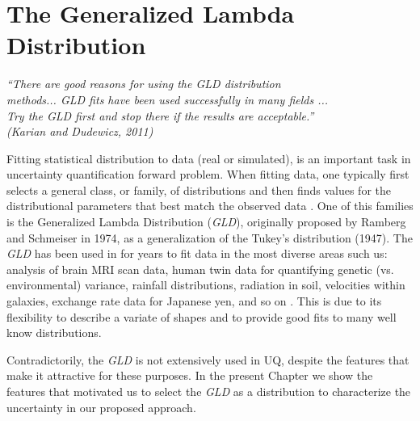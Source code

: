 \chapter[The Generalized Lambda Distribution]{The Generalized Lambda Distribution}\label{cap:gld}

\begin{flushright}
	\textit{``There are good reasons for using the GLD distribution \\
	methods... GLD fits have been used successfully in many fields ...\\
	Try the GLD first and stop there if the results are acceptable.''\\
	(Karian and Dudewicz, 2011)}
\end{flushright}


Fitting statistical distribution to data (real or simulated), is an important task in uncertainty quantification forward problem. When fitting data, one typically first selects a general class, or family, of distributions and then finds values for the distributional parameters that best match the observed data \cite{Lakhany2000}. One of this families is the Generalized Lambda Distribution (\textit{GLD}), originally proposed by Ramberg and Schmeiser in 1974, as a generalization of the Tukey's distribution (1947). The \textit{GLD} has been used in for years to fit data in the most diverse areas such us: analysis of brain MRI scan data, human twin data for quantifying genetic (vs. environmental) variance, rainfall distributions, radiation in soil, velocities within galaxies, exchange rate data for Japanese yen, and so on \cite{Karian2011}. This is due to its flexibility to describe a variate of shapes and to provide good fits to many well know distributions.    

Contradictorily, the \textit{GLD} is not extensively used in UQ, despite the features that make it attractive for these purposes. In the present Chapter we show the features that motivated us to select the \textit{GLD} as a distribution to characterize the uncertainty in our proposed approach.

